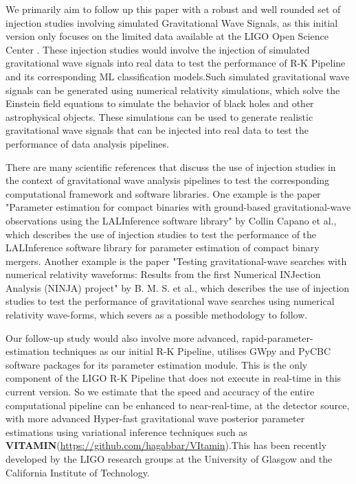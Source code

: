 We primarily aim to follow up this paper with a robust and well rounded set of injection studies involving simulated Gravitational Wave Signals, as this initial version only focuses on the limited data available at the LIGO Open Science Center \cite{00_LIGOOpenSciData}. These injection studies would involve the injection of simulated gravitational wave signals into real data to test the performance of R-K Pipeline and its corresponding ML classification models.Such simulated gravitational wave signals can be generated using numerical relativity simulations, which solve the Einstein field equations to simulate the behavior of black holes and other astrophysical objects. These simulations can be used to generate realistic gravitational wave signals that can be injected into real data to test the performance of data analysis pipelines.

There are many scientific references that discuss the use of injection studies in the context of gravitational wave analysis pipelines to test the corresponding computational framework and software libraries. One example is the paper "Parameter estimation for compact binaries with ground-based gravitational-wave observations using the LALInference software library" by Collin Capano et al.,\cite{26.0_2019parameterInjection} \cite{26.1_2021reliabilityParameterInjection} which describes the use of injection studies to test the performance of the LALInference software library for parameter estimation of compact binary mergers. Another example is the paper "Testing gravitational-wave searches with numerical relativity waveforms: Results from the first Numerical INJection Analysis (NINJA) project" by B. M. S. et al.\cite{26.2_2009testingInjection}, which describes the use of injection studies to test the performance of gravitational wave searches using numerical relativity wave-forms, which severs as a possible methodology to follow.

Our follow-up study would also involve more advanced, rapid-parameter-estimation techniques as our initial R-K Pipeline, utilises GWpy \cite{25.4_CBC2021gwpy} and PyCBC \cite{25.5_2019pycbcInference} software packages for its parameter estimation module. This is the only component of the LIGO R-K Pipeline that does not execute in real-time in this current version. So we estimate that the speed and accuracy of the entire computational pipeline can be enhanced to near-real-time, at the detector source, with more advanced Hyper-fast gravitational wave posterior parameter estimations using variational inference techniques such as \textbf{VITAMIN}(\hyperlink{website}{https://github.com/hagabbar/VItamin}).This has been recently developed by the LIGO research groups at the University of Glasgow and the California Institute of Technology. \cite{25.6_Glasgow2019VITAMIN}

